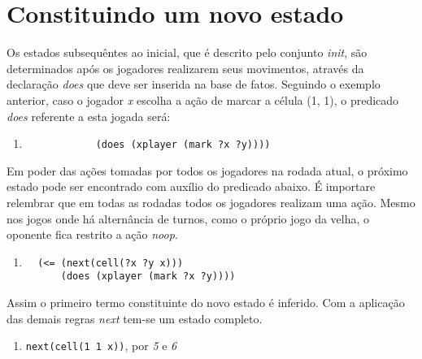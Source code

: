  
 \section{Constituindo um novo estado}
 Os estados subsequêntes ao inicial, que é descrito pelo conjunto \textit{init}, são determinados após os jogadores realizarem seus movimentos, através da declaração \textit{does} que deve ser inserida na base de fatos. Seguindo o exemplo anterior, caso o jogador \textit{x} escolha a ação de marcar a célula (1, 1), o predicado \textit{does} referente a esta jogada será:
\begin{enumerate}
  	\singlespacing
  	\setcounter{enumi}{4}
	\item 
		\begin{verbatim}
			(does (xplayer (mark ?x ?y))))
		\end{verbatim}		
\end{enumerate}
 \doublespacing

Em poder das ações tomadas por todos os jogadores na rodada atual, o próximo estado pode ser encontrado com auxílio do predicado abaixo. É importare relembrar que em todas as rodadas todos os jogadores realizam uma ação. Mesmo nos jogos onde há alternância de turnos, como o próprio jogo da velha, o oponente fica restrito a ação \textit{noop}.
\begin{enumerate}
  	\singlespacing
  	\setcounter{enumi}{5}
   	\item 
   		\begin{verbatim}
  (<= (next(cell(?x ?y x)))
      (does (xplayer (mark ?x ?y))))               
 		\end{verbatim}
\end{enumerate}
\doublespacing
Assim o primeiro termo constituinte do novo estado é inferido. Com a aplicação das demais regras \textit{next} tem-se um estado completo. 
\begin{enumerate}
  	\singlespacing
  	\setcounter{enumi}{6}
	\item 
		\verb|next(cell(1 1 x))|, por {\it 5} e {\it 6}
\end{enumerate}
\doublespacing